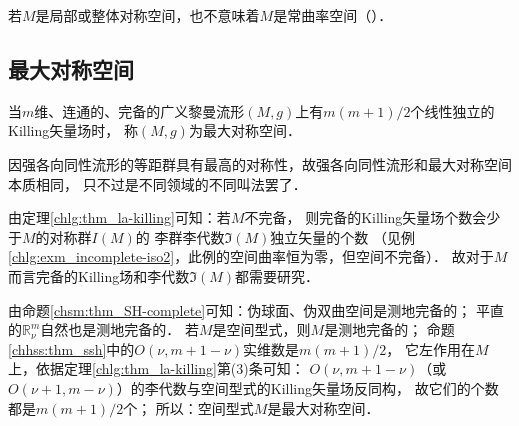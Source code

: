 若$M$是局部或整体对称空间，也不意味着$M$是常曲率空间（\parencite[Ch.12]{wolf_SCC-2011}）．





 

\subsection{最大对称空间}


\begin{definition}
    当$m$维、连通的、完备的广义黎曼流形$(M,g)$上有$m(m+1)/2$个线性独立的Killing矢量场时，
    称$(M,g)$为{\heiti 最大对称空间}．  %
\end{definition}


因强各向同性流形的等距群具有最高的对称性，故强各向同性流形和最大对称空间本质相同，
只不过是不同领域的不同叫法罢了．

由定理\ref{chlg:thm_la-killing}可知：若$M$不完备，
则完备的Killing矢量场个数会少于$M$的对称群$I(M)$的
李群李代数$\mathfrak{I}(M)$独立矢量的个数
（见例\ref{chlg:exm_incomplete-iso2}，此例的空间曲率恒为零，但空间不完备）．
故对于$M$而言完备的Killing场和李代数$\mathfrak{I}(M)$都需要研究．

由命题\ref{chsm:thm_SH-complete}可知：伪球面、伪双曲空间是测地完备的；
平直的$\mathbb{R}^m_\nu$自然也是测地完备的．
若$M$是{\kaishu 空间型式}，则$M$是测地完备的；
命题\ref{chhss:thm_ssh}中的$O(\nu,m+1-\nu)$实维数是$m(m+1)/2$，
它左作用在$M$上，依据定理\ref{chlg:thm_la-killing}第(3)条可知：
$O(\nu,m+1-\nu)$（或$O(\nu+1,m-\nu)$）的李代数与空间型式的Killing矢量场反同构，
故它们的个数都是$m(m+1)/2$个；
所以：{\kaishu 空间型式$M$是最大对称空间}．





